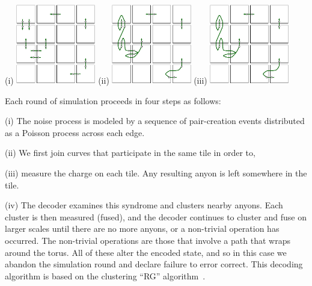 \documentclass[12pt,notitlepage,aps,pra,longbibliography,nofootinbib,tightenlines,superscriptaddress]{revtex4}
\begin{document}
\begin{center}
(i)
\includegraphics[width=0.26\textwidth]{pair-create.pdf}
\hskip 10pt
(ii)
\includegraphics[width=0.26\textwidth]{syndrome-1.pdf}
\hskip 10pt
(iii)
\includegraphics[width=0.26\textwidth]{syndrome-2.pdf}
\end{center}

Each round of simulation proceeds in four steps as follows:

(i) The noise process is modeled by
a sequence of pair-creation events distributed as
a Poisson process across each edge.

(ii) We first
join curves that participate in the same tile
in order to,

(iii) measure the charge on each tile.
Any resulting anyon is left somewhere in the tile.

(iv) The decoder examines this syndrome and clusters
nearby anyons. Each cluster is then measured (fused),
and the decoder continues to cluster and fuse on larger scales until
there are no more anyons, or a non-trivial operation has occurred.
The non-trivial operations are those that involve a path that wraps
around the torus. All of these alter the encoded
state, and so in this case we abandon the
simulation round and declare failure to error correct.
This decoding algorithm is based on the clustering ``RG''
algorithm~\cite{Bravyi2011}.
\end{document}
